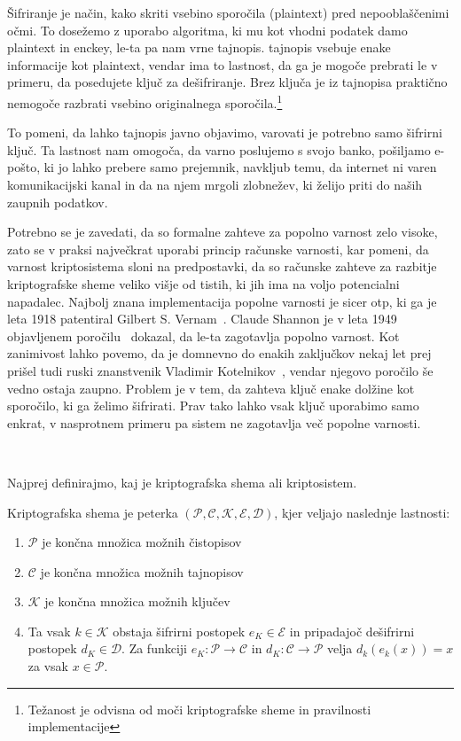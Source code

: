 \documentclass[12pt,a4paper,openany,tikz]{book}
\theoremstyle{plain}
\theoremstyle{definition}
\begin{document}
Šifriranje je način, kako skriti vsebino sporočila (\gls{plaintext}) pred nepooblaščenimi očmi. To dosežemo z uporabo algoritma, ki mu kot vhodni podatek damo \gls{plaintext} in \gls{enckey}, le-ta pa nam vrne \gls{tajnopis}. \Gls{tajnopis} vsebuje enake informacije kot \gls{plaintext}, vendar ima to lastnost, da ga je mogoče prebrati le v primeru, da posedujete ključ za dešifriranje. Brez ključa je iz \gls{tajnopis}a praktično nemogoče razbrati vsebino originalnega sporočila.\footnote{Težanost je odvisna od moči kriptografske sheme in pravilnosti implementacije}

To pomeni, da lahko tajnopis javno objavimo, varovati je potrebno samo šifrirni ključ. Ta lastnost nam omogoča, da varno poslujemo s svojo banko, pošiljamo e-pošto, ki jo lahko prebere samo prejemnik, navkljub temu, da internet ni varen komunikacijski kanal in da na njem mrgoli zlobnežev, ki želijo priti do naših zaupnih podatkov.

Potrebno se je zavedati, da so formalne zahteve za popolno varnost zelo visoke, zato se v praksi največkrat uporabi princip računske varnosti, kar pomeni, da varnost kriptosistema sloni na predpostavki, da so računske zahteve za razbitje kriptografske sheme veliko višje od tistih, ki jih ima na voljo potencialni napadalec. Najbolj znana implementacija popolne varnosti je sicer \gls{otp}, ki ga je leta 1918 patentiral Gilbert S. Vernam~\cite{vernam1919secret}. Claude Shannon je v leta 1949 objavljenem poročilu~\cite{shannon1949communication} dokazal, da le-ta zagotavlja popolno varnost. Kot zanimivost lahko povemo, da je domnevno do enakih zaključkov nekaj let prej prišel tudi ruski znanstvenik Vladimir Kotelnikov~\cite{molotkov2006quantum}, vendar njegovo poročilo še vedno ostaja zaupno. Problem  je v tem, da zahteva ključ enake dolžine kot sporočilo, ki ga želimo šifrirati. Prav tako lahko vsak ključ uporabimo samo enkrat, v nasprotnem primeru pa sistem ne zagotavlja več popolne varnosti.

\

Najprej definirajmo, kaj je kriptografska shema ali kriptosistem.

\begin{mdframed}[frametitle={Kriptografska shema}]
Kriptografska shema je peterka  $(\mathcal{P}, \mathcal{C}, \mathcal{K},  \mathcal{E}, \mathcal{D})$, kjer veljajo naslednje lastnosti:
	\begin{enumerate}
		\item $\mathcal{P}$ je končna množica možnih čistopisov
		\item $\mathcal{C}$ je končna množica možnih tajnopisov
		\item $\mathcal{K}$ je končna množica možnih ključev
		\item Ta vsak $k \in \mathcal{K}$ obstaja šifrirni postopek $e_K \in \mathcal{E}$ in pripadajoč dešifrirni postopek $d_K \in \mathcal{D}$. Za funkciji $e_K: \mathcal{P} \rightarrow \mathcal{C}$ in $d_K: \mathcal{C} \rightarrow \mathcal{P}$ velja $d_k(e_k(x)) = x$ za vsak $x \in \mathcal{P}$.
	\end{enumerate}
\end{mdframed}
\end{document}
